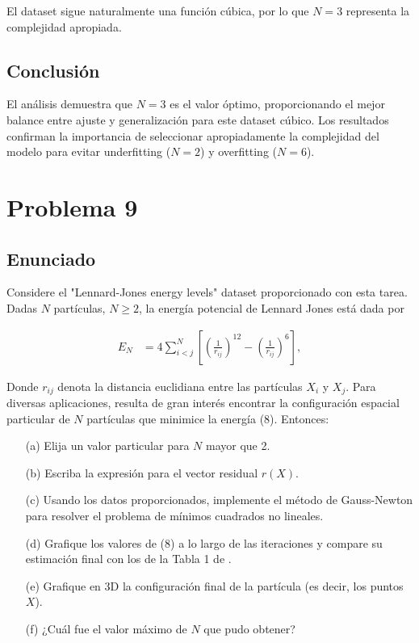 \documentclass{article}
\begin{document}
El dataset sigue naturalmente una función cúbica, por lo que $N=3$ representa la complejidad apropiada.

\subsection{Conclusión}

El análisis demuestra que $N=3$ es el valor óptimo, proporcionando el mejor balance entre ajuste y generalización para este dataset cúbico. Los resultados confirman la importancia de seleccionar apropiadamente la complejidad del modelo para evitar underfitting ($N=2$) y overfitting ($N=6$).

\section{Problema 9}

\subsection{Enunciado}

Considere el "Lennard-Jones energy levels" dataset proporcionado con esta tarea. Dadas $N$ partículas, $N \ge 2$, la energía potencial de Lennard Jones está dada por

\begin{align} \tag{8}
    E_N &= 4 \sum_{i<j}^{N} \left[ \left(\frac{1}{r_{ij}}\right)^{12} - \left(\frac{1}{r_{ij}}\right)^{6} \right],
\end{align}

Donde $r_{ij}$ denota la distancia euclidiana entre las partículas $X_i$ y $X_j$. Para diversas aplicaciones, resulta de gran interés encontrar la configuración espacial particular de $N$ partículas que minimice la energía (8). Entonces:

\begin{itemize}
    \item[(a)] Elija un valor particular para $N$ mayor que 2.
    \item[(b)] Escriba la expresión para el vector residual $r(X)$.
    \item[(c)] Usando los datos proporcionados, implemente el método de Gauss-Newton para resolver el problema de mínimos cuadrados no lineales.
    \item[(d)] Grafique los valores de (8) a lo largo de las iteraciones y compare su estimación final con los de la Tabla 1 de \cite{wales1997}.
    \item[(e)] Grafique en 3D la configuración final de la partícula (es decir, los puntos $X$).
    \item[(f)] ¿Cuál fue el valor máximo de $N$ que pudo obtener?
\end{itemize}
\end{document}
